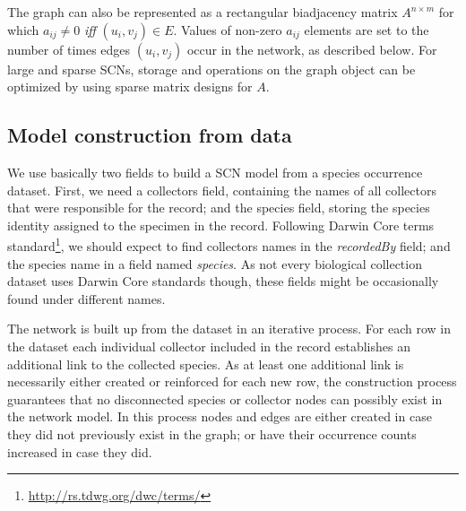 The graph can also be represented as a rectangular biadjacency matrix $A^{n\times m}$ for which $a_{ij}\neq 0$ \textit{iff} $(u_i,v_j) \in E$. Values of non-zero $a_{ij}$ elements are set to the number of times edges $(u_i,v_j)$ occur in the network, as described below. 
For large and sparse SCNs, storage and operations on the graph object can be optimized by using sparse matrix designs for $A$.


  
\subsection{Model construction from data}
We use basically two fields to build a SCN model from a species occurrence dataset. First, we need a collectors field, containing the names of all collectors that were responsible for the record; and the species field, storing the species identity assigned to the specimen in the record.
Following Darwin Core terms standard\footnote{\url{http://rs.tdwg.org/dwc/terms/}}, we should expect to find collectors names in the \textit{recordedBy} field; and the species name in a field named \textit{species}. As not every biological collection dataset uses Darwin Core standards though, these fields might be occasionally found under different names.

The network is built up from the dataset in an iterative process.
For each row in the dataset each individual collector included in the record establishes an additional link to the collected species.
As at least one additional link is necessarily either created or reinforced for each new row, the construction process guarantees that no disconnected species or collector nodes can possibly exist in the network model.
In this process nodes and edges are either created in case they did not previously exist in the graph; or have their occurrence counts increased in case they did.



